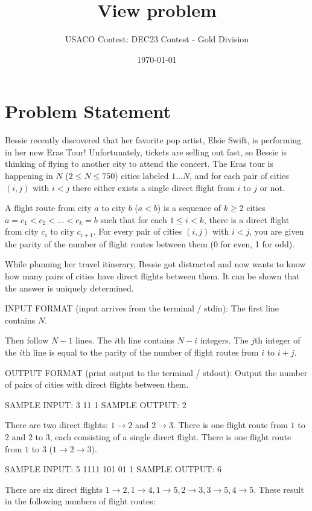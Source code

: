 \documentclass[12pt]{article}
\title{View problem}
\author{USACO Contest: DEC23 Contest - Gold Division}
\date{\today}
\begin{document}
\maketitle

\section*{Problem Statement}


Bessie recently discovered that her favorite pop artist, Elsie Swift, is
performing in her new Eras Tour! Unfortunately, tickets are selling out fast, so
Bessie is thinking of flying to another city to attend the concert. The Eras
tour is happening in $N$ ($2\le N\le 750$) cities labeled $1\dots N$, and for
each pair of cities $(i,j)$ with $i<j$ there either exists a single direct
flight from $i$ to $j$ or not.

A flight route from city $a$ to city $b$ ($a<b$) is a sequence of $k\ge 2$ cities
$a=c_1<c_2<\dots<c_k=b$ such that for each $1\le i<k$, there is a direct flight
from city $c_i$ to city $c_{i+1}$. For every pair of cities $(i,j)$ with $i<j$,
you are given the parity of the number of flight routes between them (0 for
even, 1 for odd). 

While planning her travel itinerary, Bessie got distracted and now wants to know
how many pairs of cities have direct flights between them. It can be  shown that
the answer is uniquely determined.

INPUT FORMAT (input arrives from the terminal / stdin):
The first line contains $N$.

Then follow $N-1$ lines. The $i$th line contains $N-i$ integers. The $j$th 
integer of the $i$th line is equal to the parity of the number of flight routes
from $i$ to $i+j$.

OUTPUT FORMAT (print output to the terminal / stdout):
Output the number of pairs of cities with direct flights between them.

SAMPLE INPUT:
3
11
1
SAMPLE OUTPUT: 
2

There are two direct flights: $1\to 2$ and $2\to 3$. There is one flight route
from $1$ to $2$ and $2$ to $3$, each consisting of a single direct flight. There
is one flight route from $1$ to $3$ ($1\to 2\to 3$).

SAMPLE INPUT:
5
1111
101
01
1
SAMPLE OUTPUT: 
6

There are six direct flights $1\to 2, 1\to 4, 1\to 5, 2\to 3, 3\to 5, 4\to 5$.
These result in the following numbers of flight routes:
\end{document}
